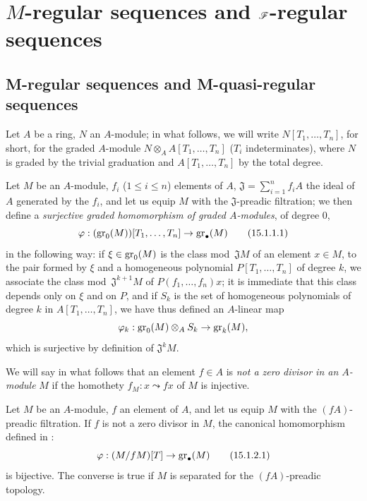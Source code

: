 \section{\texorpdfstring{$M$}{M}-regular sequences and \texorpdfstring{$\mathscr{F}$}{F}-regular sequences}
\label{section:0.15}

\subsection{M-regular sequences and M-quasi-regular sequences}
\label{subsection:0.15.1}
\label{0.15.1}

\begin{env}[15.1.1]
\label{0.15.1.1}
Let $A$ be a ring, $N$ an $A$-module;
in what follows, we will write $N[T_1,\ldots,T_n]$, for short, for the graded $A$-module $N\otimes_A A[T_1,\ldots,T_n]$ ($T_i$ indeterminates), where $N$ is graded by the trivial graduation and $A[T_1,\ldots,T_n]$ by the total degree.

Let $M$ be an $A$-module, $f_i$ ($1\leq i\leq n$) elements of $A$, $\mathfrak{J}=\sum_{i=1}^n f_iA$ the ideal of $A$ generated by the $f_i$, and let us equip $M$ with the $\mathfrak{J}$-preadic filtration;
we then define a \emph{surjective graded homomorphism of graded $A$-modules}, of degree $0$,
\[
\label{0.15.1.1.1}
  \varphi : (\operatorname{gr}_0(M))[T_1,\ldots,T_n] \to \operatorname{gr}_\bullet(M)
\tag{15.1.1.1}
\]
in the following way:
if $\xi\in\operatorname{gr}_0(M)$ is the class mod~$\mathfrak{J}M$ of an element $x\in M$, to the pair formed by $\xi$ and a homogeneous polynomial $P[T_1,\ldots,T_n]$ of degree $k$, we associate the class mod~$\mathfrak{J}^{k+1}M$ of $P(f_1,\ldots,f_n)x$;
it is immediate that this class depends only on $\xi$ and on $P$, and if $S_k$ is the set of homogeneous polynomials of degree $k$ in $A[T_1,\ldots,T_n]$, we have thus defined an $A$-linear map
\[
  \varphi_k : \operatorname{gr}_0(M)\otimes_A S_k \to \operatorname{gr}_k(M),
\]
which is surjective by definition of $\mathfrak{J}^k M$.

We will say in what follows that an element $f\in A$ is \emph{not a zero divisor in an $A$-module} $M$ if the homothety $f_M:x\leadsto fx$ of $M$ is injective.
\end{env}

\begin{lemma}[15.1.2]
\label{0.15.1.2}
Let $M$ be an $A$-module, $f$ an element of $A$, and let us equip $M$ with the $(fA)$-preadic filtration.
If $f$ is not a zero divisor in $M$, the canonical homomorphism defined in :
\[
\label{0.15.1.2.1}
  \varphi : (M/fM)[T] \to \operatorname{gr}_\bullet(M)
\tag{15.1.2.1}
\]
is bijective.
The converse is true if $M$ is separated for the $(fA)$-preadic topology.
\end{lemma}

